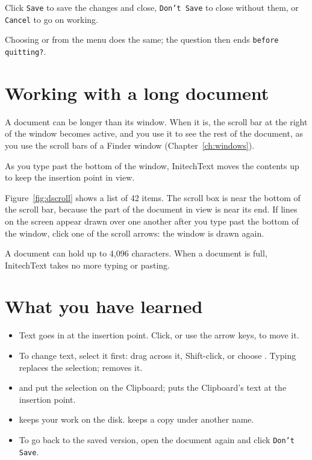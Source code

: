 
\begin{TaskSteps}[resume]
\Step Click \texttt{Save} to save the changes and close, \texttt{Don't
Save} to close without them, or \texttt{Cancel} to go on working.
\end{TaskSteps}
Choosing  or  from the  menu
does the same; the question then ends \texttt{before quitting?}.

\section{Working with a long document}
A document can be longer than its window.  When it is, the scroll bar at
the right of the window becomes active, and you use it to see the rest of
the document, as you use the scroll bars of a Finder window
(Chapter~\ref{ch:windows}).

As you type past the bottom of the window, InitechText moves the contents
up to keep the insertion point in view.


Figure~\ref{fig:dscroll} shows a list of 42 items.  The scroll box is near
the bottom of the scroll bar, because the part of the document in view is
near its end.  If lines on the screen appear drawn over one another after
you type past the bottom of the window, click one of the scroll arrows:
the window is drawn again.

A document can hold up to 4,096 characters.  When a document is full, InitechText takes no more typing or
pasting.

\section{What you have learned}
\begin{itemize}
\item Text goes in at the insertion point.  Click, or use the arrow keys,
  to move it.
\item To change text, select it first: drag across it, Shift-click, or
  choose .  Typing replaces the selection;
   removes it.
\item {} and  put the selection on the
  Clipboard;  puts the Clipboard's text at the insertion
  point.
\item {} keeps your work on the disk.  
  keeps a copy under another name.
\item To go back to the saved version, open the document again and click
  \texttt{Don't Save}.
\end{itemize}
